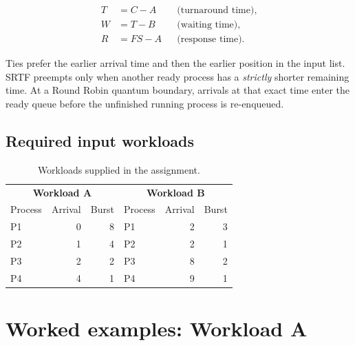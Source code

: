 \documentclass[11pt,a4paper]{article}
\begin{document}
\begin{center}
  \colorbox{softblue}{\parbox{0.75\linewidth}{
      \begin{align*}
        T & = C-A  &  & \text{(turnaround time)}, \\
        W & = T-B  &  & \text{(waiting time)},    \\
        R & = FS-A &  & \text{(response time)}.
      \end{align*}
    }}
\end{center}

Ties prefer the earlier arrival time and then the earlier position in the input
list. SRTF preempts only when another ready process has a \emph{strictly} shorter
remaining time. At a Round Robin quantum boundary, arrivals at that exact time
enter the ready queue before the unfinished running process is re-enqueued.

\subsection{Required input workloads}

\begin{table}[H]
  \centering
  \caption{Workloads supplied in the assignment.}
  \begin{tabular}{lrr@{\qquad}lrr}
    \toprule
    \multicolumn{3}{c}{\textbf{Workload A}} & \multicolumn{3}{c}{\textbf{Workload B}}                                     \\
    Process                                 & Arrival                                 & Burst & Process & Arrival & Burst \\
    \midrule
    P1                                      & 0                                       & 8     & P1      & 2       & 3     \\
    P2                                      & 1                                       & 4     & P2      & 2       & 1     \\
    P3                                      & 2                                       & 2     & P3      & 8       & 2     \\
    P4                                      & 4                                       & 1     & P4      & 9       & 1     \\
    \bottomrule
  \end{tabular}
\end{table}

\section{Worked examples: Workload A}
\end{document}
